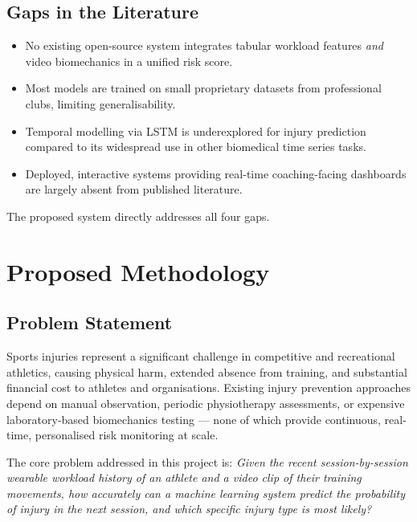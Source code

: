 \documentclass[12pt,a4paper]{report}
\begin{document}
\section{Gaps in the Literature}

\begin{itemize}
  \item No existing open-source system integrates tabular workload features \textit{and} video biomechanics in a unified risk score.
  \item Most models are trained on small proprietary datasets from professional clubs, limiting generalisability.
  \item Temporal modelling via LSTM is underexplored for injury prediction compared to its widespread use in other biomedical time series tasks.
  \item Deployed, interactive systems providing real-time coaching-facing dashboards are largely absent from published literature.
\end{itemize}

The proposed system directly addresses all four gaps.
\clearpage

\chapter{Proposed Methodology}

\section{Problem Statement}

Sports injuries represent a significant challenge in competitive and recreational athletics, causing physical harm, extended absence from training, and substantial financial cost to athletes and organisations. Existing injury prevention approaches depend on manual observation, periodic physiotherapy assessments, or expensive laboratory-based biomechanics testing — none of which provide continuous, real-time, personalised risk monitoring at scale.

\par
The core problem addressed in this project is: \textit{Given the recent session-by-session wearable workload history of an athlete and a video clip of their training movements, how accurately can a machine learning system predict the probability of injury in the next session, and which specific injury type is most likely?}
\end{document}
